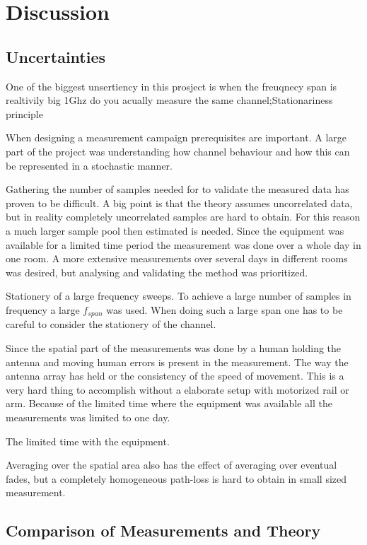\chapter{Discussion}
\section{Uncertainties}
One of the biggest unsertiency in this prosject is when the freuqnecy span is realtivily big 1Ghz do you acually measure the same channel;Stationariness principle

When designing a measurement campaign prerequisites are important. A large part of the project was understanding how channel behaviour and how this can be represented in a stochastic manner. 

Gathering the number of samples needed for to validate the measured data has proven to be difficult. A big point is that the theory assumes uncorrelated data, but in reality completely uncorrelated samples are hard to obtain. For this reason a much larger sample pool then estimated is needed. Since the equipment was available for a limited time period the measurement was done over a whole day in one room. A more extensive measurements over several days in different rooms was desired, but analysing and validating the method was prioritized.

Stationery of a large frequency sweeps.
To achieve a large number of samples in frequency a large $f_{span}$ was used. When doing such a large span one has to be careful to consider the stationery of the channel.

Since the spatial part of the measurements was done by a human holding the antenna and moving human errors is present in the measurement. The way the antenna array has held or the consistency of the speed of movement. This is a very hard thing to accomplish without a elaborate setup with motorized rail or arm. Because of the limited time where the equipment was available all the measurements was limited to one day.

The limited time with the equipment.


Averaging over the spatial  area also has the effect of averaging over eventual fades, but a completely homogeneous path-loss is hard to obtain in small sized measurement.

\section{Comparison of Measurements and Theory}